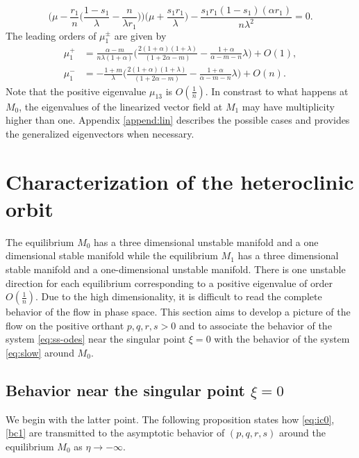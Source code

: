 \documentclass[11pt]{article}
\def\BO{{{O}}}
\theoremstyle{remark}
\begin{document}
\begin{itemize}
 $$
 \Big(\mu - \frac{r_1}{n}\Big(\frac{1-s_1}{\lambda}-\frac{n}{\lambda r_1}\Big)\Big)\Big(\mu + \frac{s_1r_1}{\lambda}\Big) - %
\frac{s_1r_1(1-s_1)(\alpha r_1)}{n\lambda^2} = 0.
$$
The leading orders of $\mu_1^\pm$ are given by
\begin{align*}
\mu_1^+ &= \frac{\alpha-m}{n\lambda(1+\alpha)}\Big(\frac{2(1+\alpha)(1+\lambda)}{(1+2\alpha-m) } - \frac{1+\alpha}{\alpha-m-n}\lambda\Big) + \BO(1), \\
\mu_1^- &= -\frac{1+m}{\lambda}\Big(\frac{2(1+\alpha)(1+\lambda)}{(1+2\alpha-m) } - \frac{1+\alpha}{\alpha-m-n}\lambda\Big) + \BO(n).
\end{align*}
Note that the positive eigenvalue $\mu_{13}$ is $\BO( \frac{1}{n})$.
In constrast to what happens at $M_0$, the eigenvalues of the linearized vector field at $M_1$ may have multiplicity higher than one. Appendix \ref{append:lin} describes  the possible cases and provides the generalized eigenvectors when necessary.
\end{itemize}

\section{Characterization of the heteroclinic orbit} \label{sec:char}
The equilibrium $M_0$ has a three dimensional unstable manifold and a one dimensional stable manifold while the equilibrium $M_1$ has a three dimensional
stable manifold and a one-dimensional unstable manifold. There is one unstable direction for each equilibrium corresponding to a positive
eigenvalue of order $\BO (\frac{1}{n})$.  Due to the high dimensionality, it is difficult to read the complete behavior
of the flow in phase space. This section aims to develop a picture of the flow on the positive orthant $p,q,r,s > 0$ and
to associate the behavior  of the system \eqref{eq:ss-odes} near the singular point $\xi = 0$ with the behavior of the system \eqref{eq:slow} around $M_0$.

\subsection{Behavior near the singular point $\xi =0$}
We begin with the latter point. The following proposition states how \eqref{eq:ic0}, \eqref{bc1} are transmitted to the asymptotic behavior of $(p,q,r,s)$
around the equilibrium $M_0$ as $\eta \to -\infty$.
\end{document}
